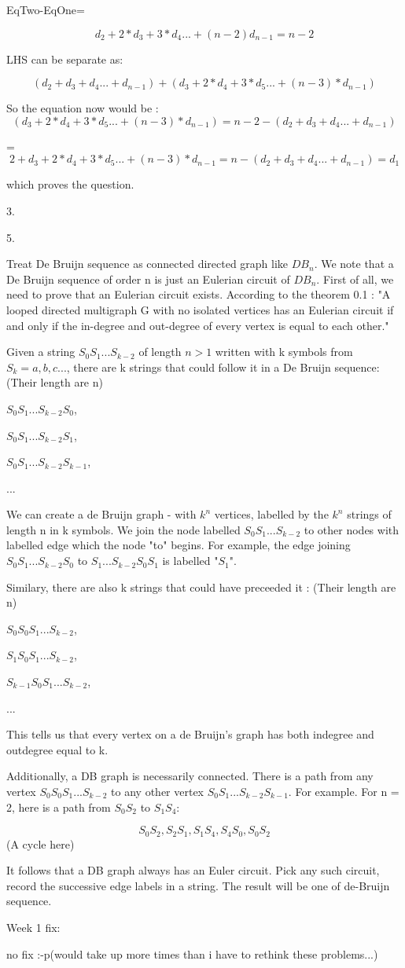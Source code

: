 \documentclass{article}
\begin{document}
EqTwo-EqOne=

$$d_2+2*d_3+3*d_4...+(n-2)d_{n-1}=n-2$$

LHS can be separate as:

$$(d_2+d_3+d_4...+d_{n-1})+(d_3+2*d_4+3*d_5...+(n-3)*d_{n-1})$$

So the equation now would be :
$$(d_3+2*d_4+3*d_5...+(n-3)*d_{n-1}) = n-2 - (d_2+d_3+d_4...+d_{n-1})$$

=$$2+d_3+2*d_4+3*d_5...+(n-3)*d_{n-1} = n-(d_2+d_3+d_4...+d_{n-1}) = d_1$$

which proves the question.

3.





5.

Treat De Bruijn sequence as connected directed graph like $DB_n$.
We note that a De Bruijn sequence of order n is just an Eulerian
circuit of $DB_n$. 
First of all, we need to prove that an Eulerian circuit exists. According to the theorem 0.1 : "A looped directed multigraph
G with no isolated vertices has an Eulerian circuit if and only if the in-degree and out-degree of every vertex is equal to each other."

Given a string $S_0S_1...S_{k-2}$ of length $n > 1$ written with k symbols from $S_k={a,b,c...}$, there are k strings that could follow it in a De Bruijn sequence:
(Their length are n)

$S_0S_1...S_{k-2}S_0$, 

$S_0S_1...S_{k-2}S_1$,

$S_0S_1...S_{k-2}S_{k-1}$,

...

We can create a de Bruijn graph - with $k^n$ vertices, labelled by the $k^n$ strings of length n in k symbols. We join the node labelled $S_0S_1...S_{k-2}$ to other nodes with labelled edge which the node "to" begins. For example, the edge joining $S_0S_1...S_{k-2}S_0$ to $S_1...S_{k-2}S_0S_1$ is labelled "$S_1$".

Similary, there are also k strings that could have preceeded it :
(Their length are n)

$S_0S_0S_1...S_{k-2}$, 

$S_1S_0S_1...S_{k-2}$, 

$S_{k-1}S_0S_1...S_{k-2}$,

...

This tells us that every vertex on a de Bruijn's graph has both indegree and outdegree equal to k.

Additionally, a DB graph is necessarily connected. There is a path from any vertex $S_0S_0S_1...S_{k-2}$ to any other vertex $S_0S_1...S_{k-2}S_{k-1}$. For example. For n = 2, here is a path from $S_0S_2$ to $S_1S_4$:

$$S_0S_2, S_2S_1, S_1S_4 , S_4S_0 , S_0S_2$$(A cycle here)

It follows that a DB graph always has an Euler circuit. Pick any such circuit, record the successive edge labels in a string. The result will be one of de-Bruijn sequence.


Week 1 fix:

no fix :-p(would take up more times than i have to rethink these problems...)
\end{document}
